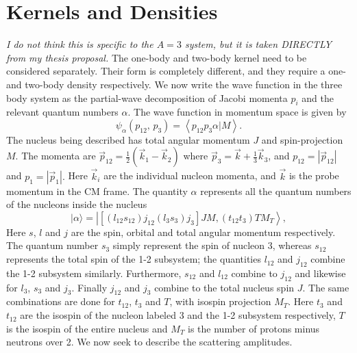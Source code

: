 \documentclass[a4paper,11pt]{article}
\newcommand{\bkt}[2]{\left \langle #1 |#2 \right \rangle}
\newcommand\bv[1]{\vec{#1}}
\newcommand{\ques}[1]{\color{red}\textit{ #1 }\color{black}}
\begin{document}
\section{Kernels and Densities}
\ques{I do not think this is specific to the $A=3$ system, but it is taken DIRECTLY from my thesis proposal.}
The one-body and two-body kernel need to be considered separately.
Their form is completely different, and they require a one- and two-body density respectively.
We now write the wave function in the three body system as the
partial-wave decomposition of Jacobi momenta $p_i$ and the relevant
quantum numbers $\alpha$. The wave function in momentum space is given by
\begin{equation}
  \psi_\alpha (p_{12},\, p_3 ) = \bkt{p_{12} p_3 \alpha}{M}.
\end{equation}
The nucleus being described has total angular momentum $J$ and
spin-projection $M$. The momenta are $\bv{p}_{12}= \frac{1}{2}
\left(\bv{k}_1 - \bv{k}_2\right)$ where $ \bv{p}_3 = \bv{k}+
\frac{1}{3} \bv{k}_3 $, and $p_{12} = |\bv{p}_{12}|$ and  $p_{1} =
|\bv{p}_{1}|.$ Here $\bv{k}_i$ are the individual nucleon momenta,
and $\bv{k}$ is the probe momentum in the CM frame. The quantity
$\alpha$ represents all the quantum numbers of the nucleons inside
the nucleus~\cite{hammer2020}
\begin{equation}
  |\alpha\rangle=\left|\left[\left(l_{12} s_{12}\right)
  j_{12}\left(l_{3} s_{3}\right) j_{3}\right] J M,\left(t_{12}
  t_{3}\right) T M_{T}\right\rangle,
\end{equation}
Here $s$, $l$ and $j$ are the spin, orbital and total angular
momentum respectively. The quantum number $s_3$ simply represent the
spin of nucleon 3, whereas $s_{12}$ represents the total spin of the
1-2 subsystem; the quantities $l_{12}$ and $j_{12}$ combine the 1-2
subsystem similarly. Furthermore, $s_{12}$ and $l_{12}$ combine to
$j_{12}$ and likewise for $l_3$, $s_3$ and $j_3$. Finally $j_{12}$
and $j_3$ combine to the total nucleus spin $J$.
The same combinations are done for $t_{12}$, $t_3$ and $T$, with
isospin projection $M_T$. Here $t_3$ and $t_{12}$ are the isospin of
the nucleon labeled 3 and the 1-2 subsystem respectively, $T$ is the
isospin of the entire nucleus and $M_T$ is the number of protons
minus neutrons over 2.
We now seek to describe the scattering amplitudes.
\end{document}
